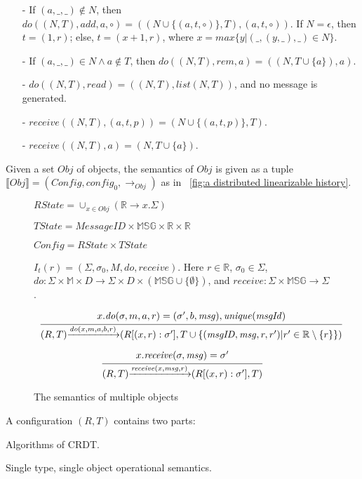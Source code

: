 \begin{example}[RGA]
\begin{itemize}
\item[-] If $(a,\_,\_) \notin N$, then $\mathit{do}((N,T),\mathit{add},a,\circ) = ((N \cup \{ (a,t,\circ) \},T),(a,t,\circ))$. If $N = \epsilon$, then $t = (1,r)$; else, $t = (x+1,r)$, where $x = \mathit{max}\{ y \vert (\_,(y,\_),\_) \in N \}$.

\item[-] If $(a,\_,\_) \in N \wedge a \notin T$, then $\mathit{do}((N,T),\mathit{rem},a) = ((N,T \cup \{ a \} ),a)$.

\item[-] $\mathit{do}((N,T),\mathit{read}) = ((N,T),\mathit{list}(N,T))$, and no message is generated.

\item[-] $\mathit{receive}((N,T),(a,t,p)) = (N \cup \{ (a,t,p) \},T)$.

\item[-] $\mathit{receive}((N,T),a) = (N,T \cup \{ a \})$.
\end{itemize}
\end{example} 

 Given a set $\mathit{Obj}$ of objects, the semantics of $\mathit{Obj}$ is given as a tuple $\llbracket \mathit{Obj} \rrbracket = (\mathit{Config},\mathit{config}_0,\rightarrow_{\mathit{Obj}})$ as in \figurename~\ref{fig:a distributed linearizable history}. 
 
\begin{figure}[ht]
$\mathit{RState} = \cup_{x \in \mathit{Obj}} (\mathbb{R} \rightarrow x.\Sigma)$ 

$\mathit{TState} = \mathit{MessageID} \times \mathbb{MSG} \times \mathbb{R} \times \mathbb{R}$ 

$\mathit{Config} = \mathit{RState} \times \mathit{TState}$ 

$I_t(r) = (\Sigma, \sigma_0, M, \mathit{do},\mathit{receive})$. Here $r \in \mathbb{R}$, $\sigma_0 \in \Sigma$, $\mathit{do}:\Sigma \times \mathbb{M} \times D \rightarrow \Sigma \times D \times (\mathbb{MSG} \cup \{ \emptyset \} )$, and $\mathit{receive}: \Sigma \times \mathbb{MSG} \rightarrow \Sigma$.

\[
\begin{array}{l c}
\bigfrac{ x.\mathit{do}(\sigma,m,a,r) = (\sigma',b,\mathit{msg}), \mathit{unique}(\mathit{msgId}) }
{ (R,T) {\xrightarrow{\mathit{do}(x,m,a,b,r)}} (R[(x,r):\sigma'],T \cup \{ (\mathit{msgID},\mathit{msg},r,r') \vert r' \in \mathbb{R} \setminus \{ r \} \}) } 
\end{array}
\]

\[
\begin{array}{l c}
\bigfrac{ x.\mathit{receive}(\sigma,\mathit{msg}) = \sigma'}
{ (R,T) {\xrightarrow{\mathit{receive}(x,\mathit{msg},r)}} (R[(x,r):\sigma'],T) } 
\end{array}
\] 
\caption{The semantics of multiple objects} 
\label{fig:the semantics of multiple objects}
\end{figure}

A configuration $(R,T)$ contains two parts: 

Algorithms of CRDT.

Single type, single object operational semantics.





